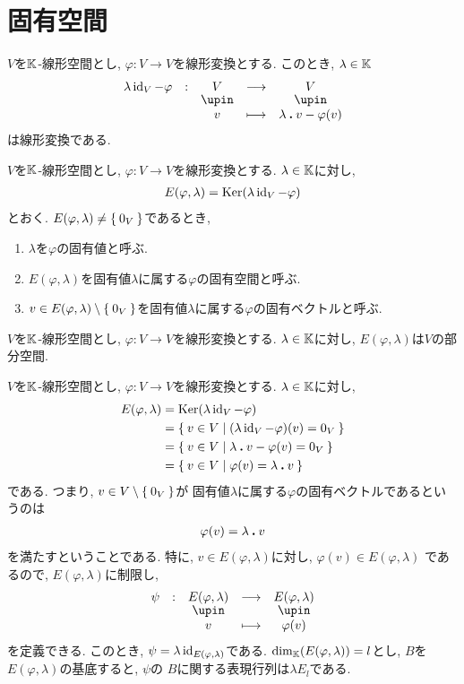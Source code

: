 \section{固有空間}

$V$を$\mathbb{K}$-線形空間とし,
$\varphi\colon V\to V$を線形変換とする.
このとき, $\lambda\in \mathbb{K}$
\begin{align*}
  \shazo{\lambda\id_V-\varphi}{V}{V}
  {v}{\lambda\act v-\varphi(v)}
\end{align*}
は線形変換である.
\begin{definition}
  $V$を$\mathbb{K}$-線形空間とし,
  $\varphi\colon V\to V$を線形変換とする.
  $\lambda \in \mathbb{K}$に対し,
  \begin{align*}
    E(\varphi,\lambda) = \operatorname{Ker}(\lambda\operatorname{id}_V-\varphi )
  \end{align*}
  とおく.
  $E(\varphi,\lambda)\neq \Set{0_V}$であるとき,
  \begin{enumerate}
  \item $\lambda$を$\varphi$の固有値と呼ぶ.
  \item $E(\varphi,\lambda)$を固有値$\lambda$に属する$\varphi$の固有空間と呼ぶ.
  \item $v\in E(\varphi,\lambda)\setminus\Set{0_V}$を固有値$\lambda$に属する$\varphi$の固有ベクトルと呼ぶ.
  \end{enumerate}
\end{definition}

\begin{remark}
  $V$を$\mathbb{K}$-線形空間とし,
  $\varphi\colon V\to V$を線形変換とする.
  $\lambda \in \mathbb{K}$に対し,
  $E(\varphi,\lambda)$は$V$の部分空間.
\end{remark}

\begin{remark}
  $V$を$\mathbb{K}$-線形空間とし,
  $\varphi\colon V\to V$を線形変換とする.
  $\lambda \in \mathbb{K}$に対し,
  \begin{align*}
    E(\varphi,\lambda) &= \operatorname{Ker}( \lambda\operatorname{id}_V - \varphi)\\
    &= \Set{v\in V|(\lambda\operatorname{id}_V-\varphi)(v)=0_V}\\
    &= \Set{v\in V|\lambda\mathbin{\boldsymbol{.}}v-\varphi(v)  =0_V}\\
    &= \Set{v\in V|\varphi(v) = \lambda\mathbin{\boldsymbol{.}}v }
  \end{align*}
  である.
  つまり, $v\in V\setminus\Set{0_V}$が
  固有値$\lambda$に属する$\varphi$の固有ベクトルであるというのは
  \begin{align*}
    \varphi(v)=\lambda\mathbin{\boldsymbol{.}} v
  \end{align*}
  を満たすということである.
  特に, $v\in E(\varphi,\lambda)$に対し, $\varphi(v)\in E(\varphi,\lambda)$
  であるので,
  $E(\varphi,\lambda)$に制限し,
  \begin{align*}
    \shazo{\psi}{E(\varphi,\lambda)}{E(\varphi,\lambda)}
    {v}{\varphi(v)}
  \end{align*}
  を定義できる. 
  このとき, $\psi=\lambda \operatorname{id}_{E(\varphi,\lambda)}$である.
  $\dim_{\mathbb{K}}(E(\varphi,\lambda))=l$とし, $B$を
  $E(\varphi,\lambda)$の基底すると,
  $\psi$の
  $B$に関する表現行列は$\lambda E_l$である.
\end{remark}
  


